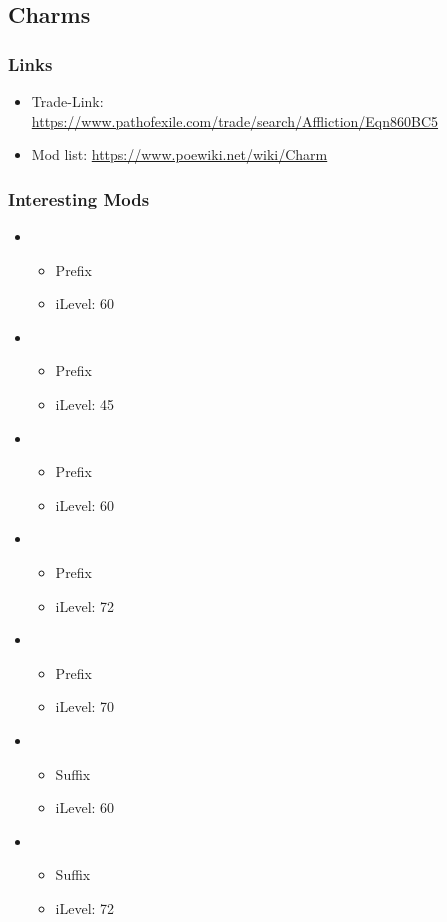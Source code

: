 \subsection{Charms}
\subsubsection{Links}
\begin{itemize}
	\item Trade-Link: \url{https://www.pathofexile.com/trade/search/Affliction/Eqn860BC5}
	\item Mod list: \url{https://www.poewiki.net/wiki/Charm}
\end{itemize}

\subsubsection{Interesting Mods}
\begin{itemize}
	\item {}
	\begin{itemize}
		\item Prefix
		\item iLevel: 60
	\end{itemize}
	\item {}
	\begin{itemize}
		\item Prefix
		\item iLevel: 45
	\end{itemize}
	\item {}
	\begin{itemize}
		\item Prefix
		\item iLevel: 60
	\end{itemize}
	\item {}
	\begin{itemize}
		\item Prefix
		\item iLevel: 72
	\end{itemize}
	\item {}
	\begin{itemize}
		\item Prefix
		\item iLevel: 70
	\end{itemize}
	\item {}
	\begin{itemize}
		\item Suffix
		\item iLevel: 60
	\end{itemize}
	\item {}
	\begin{itemize}
		\item Suffix
		\item iLevel: 72
	\end{itemize}
\end{itemize}